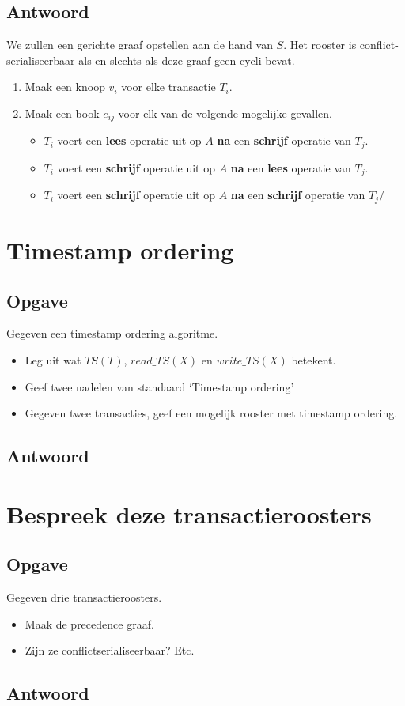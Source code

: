 \documentclass[transacties.tex]{subfiles}
\begin{document}
\subsection*{Antwoord}
We zullen een gerichte graaf opstellen aan de hand van $S$. Het rooster is conflict-serialiseerbaar als en slechts als deze graaf geen cycli bevat.
\begin{enumerate}
\item Maak een knoop $v_i$ voor elke transactie $T_i$.
\item Maak een book $e_{ij}$ voor elk van de volgende mogelijke gevallen.
\begin{itemize}
\item $T_i$ voert een \textbf{lees} operatie uit op $A$ \textbf{na} een \textbf{schrijf} operatie van $T_j$.
\item $T_i$ voert een \textbf{schrijf} operatie uit op $A$ \textbf{na} een \textbf{lees} operatie van $T_j$.
\item $T_i$ voert een \textbf{schrijf} operatie uit op $A$ \textbf{na} een \textbf{schrijf} operatie van $T_j$/
\end{itemize}
\end{enumerate}

\section{Timestamp ordering}
\subsection*{Opgave}
Gegeven een timestamp ordering algoritme.
\begin{itemize}
\item Leg uit wat $TS(T)$, $read\_TS(X)$ en $write\_TS(X)$ betekent.
\item Geef twee nadelen van standaard `Timestamp ordering'
\item Gegeven twee transacties, geef een mogelijk rooster met timestamp ordering.
\end{itemize}
\subsection*{Antwoord}

\section{Bespreek deze transactieroosters}
\subsection*{Opgave}
Gegeven drie transactieroosters.
\begin{itemize}
\item Maak de precedence graaf.
\item Zijn ze conflictserialiseerbaar? Etc.
\end{itemize}
\subsection*{Antwoord}
\end{document}
